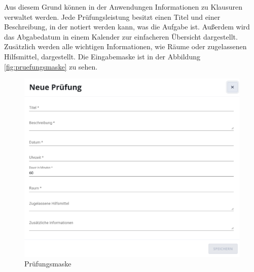 Aus diesem Grund können in der Anwendungen Informationen zu Klausuren verwaltet werden.
Jede Prüfungsleistung besitzt einen Titel und einer Beschreibung, in der notiert werden kann, was die Aufgabe ist.
Außerdem wird das Abgabedatum in einem Kalender zur einfacheren Übersicht dargestellt.
Zusätzlich werden alle wichtigen Informationen, wie Räume oder zugelassenen Hilfsmittel, dargestellt.
Die Eingabemaske ist in der Abbildung \autoref{fig:pruefungsmaske} zu sehen.
\begin{figure}[h] 
    \centering
    \includegraphics[width=.7\textwidth]{img/Pruefung_hinzugefuegen.png}
    \caption{Prüfungsmaske}
    \label{fig:pruefungsmaske}
\end{figure}
